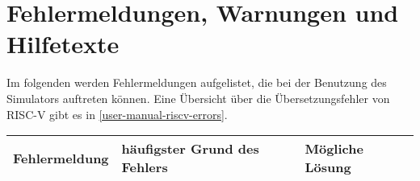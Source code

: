 
\section{Fehlermeldungen, Warnungen und Hilfetexte}

Im folgenden werden Fehlermeldungen aufgelistet, die bei der Benutzung des Simulators auftreten können.
Eine Übersicht über die Übersetzungsfehler von RISC-V gibt es in \autoref{user-manual-riscv-errors}.

\begin{tabular}{|l|l|l|}
	\hline
	Fehlermeldung & häufigster Grund des Fehlers & Mögliche Lösung\\
	\hline
\end{tabular}
